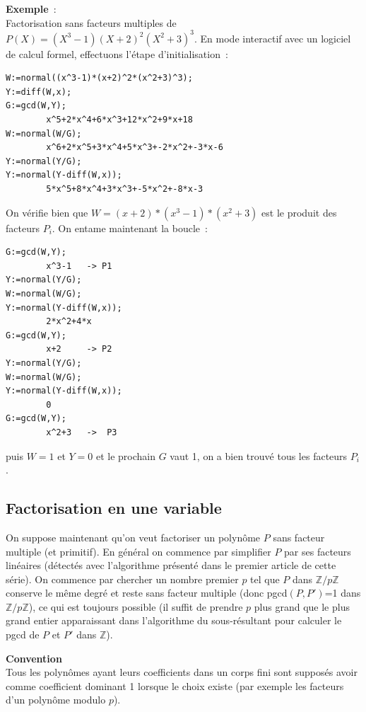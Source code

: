 \documentclass[a4paper,11pt]{article}
\newcommand{\Z}{{\mathbb{Z}}}
\begin{document}
{\bf Exemple}~:\\ 
Factorisation sans facteurs multiples de 
$P(X)=(X^3-1)(X+2)^2(X^2+3)^3$.
En mode interactif avec un logiciel de calcul formel, effectuons l'étape
d'initialisation~:
\begin{verbatim}
W:=normal((x^3-1)*(x+2)^2*(x^2+3)^3);
Y:=diff(W,x);
G:=gcd(W,Y);
        x^5+2*x^4+6*x^3+12*x^2+9*x+18
W:=normal(W/G); 
        x^6+2*x^5+3*x^4+5*x^3+-2*x^2+-3*x-6
Y:=normal(Y/G);
Y:=normal(Y-diff(W,x));
        5*x^5+8*x^4+3*x^3+-5*x^2+-8*x-3
\end{verbatim}
On vérifie bien que $W=(x+2)*(x^3-1)*(x^2+3)$ est le produit 
des facteurs $P_i$. On entame maintenant la boucle~:
\begin{verbatim}
G:=gcd(W,Y);
        x^3-1   -> P1
Y:=normal(Y/G);
W:=normal(W/G);
Y:=normal(Y-diff(W,x));
        2*x^2+4*x
G:=gcd(W,Y);
        x+2     -> P2
Y:=normal(Y/G);
W:=normal(W/G);
Y:=normal(Y-diff(W,x));
        0
G:=gcd(W,Y);
        x^2+3   ->  P3
\end{verbatim}
puis $W=1$ et $Y=0$ et le prochain $G$ vaut 1, on a bien trouvé tous
les facteurs $P_i$.

\subsection{Factorisation en une variable}
On suppose maintenant qu'on veut factoriser un polynôme $P$ sans facteur
multiple (et primitif). En général on commence par simplifier $P$ par
ses facteurs linéaires (détectés avec l'algorithme présenté dans le
premier article de cette série). On commence par chercher un nombre premier $p$
tel que $P$ dans $\Z/p\Z$ conserve le même degré et reste sans facteur 
multiple (donc pgcd$(P,P')$=1 dans $\Z/p\Z$), ce qui est toujours
possible (il suffit de prendre $p$ plus grand que le plus grand entier 
apparaissant dans l'algorithme du sous-résultant pour calculer
le pgcd de $P$ et $P'$ dans $\Z$).

{\bf Convention}\\
Tous les polynômes ayant leurs coefficients dans un corps fini sont
supposés avoir comme coefficient dominant 1 lorsque le choix
existe (par exemple les facteurs d'un polynôme modulo $p$).
\end{document}
